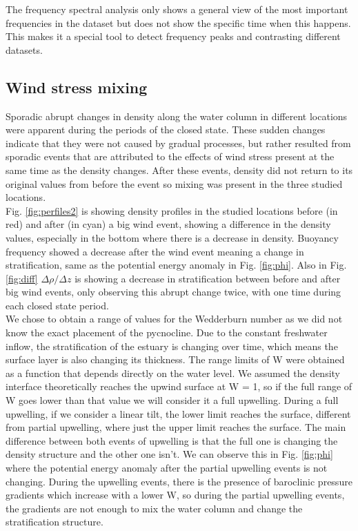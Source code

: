 \documentclass[tesis.tex]{subfiles}
\begin{document}
The frequency spectral analysis only shows a general view of the most important frequencies in the dataset but does not show the specific time when this happens. This makes it a special tool to detect frequency peaks and contrasting different datasets.\\

\subsection{Wind stress mixing}

Sporadic abrupt changes in density along the water column in different locations were apparent during the periods of the closed state. These sudden changes indicate that they were not caused by gradual processes, but rather resulted from sporadic events that are attributed to the effects of wind stress present at the same time as the density changes. After these events, density did not return to its original values from before the event so mixing was present in the three studied locations.\\

Fig. \ref{fig:perfiles2} is showing density profiles in the studied locations before (in red) and after (in cyan) a big wind event, showing a difference in the density values, especially in the bottom where there is a decrease in density. Buoyancy frequency showed a decrease after the wind event meaning a change in stratification, same as the potential energy anomaly in Fig. \ref{fig:phi}. Also in Fig. \ref{fig:diff} $\Delta \rho/\Delta z$ is showing a decrease in stratification between before and after big wind events, only observing this abrupt change twice, with one time during each closed state period.\\

We chose to obtain a range of values for the Wedderburn number as we did not know the exact placement of the pycnocline. Due to the constant freshwater inflow, the stratification of the estuary is changing over time, which means the surface layer is also changing its thickness. The range limits of W were obtained as a function that depends directly on the water level. We assumed the density interface theoretically reaches the upwind surface at W = 1, so if the full range of W goes lower than that value we will consider it a full upwelling. During a full upwelling, if we consider a linear tilt, the lower limit reaches the surface, different from partial upwelling, where just the upper limit reaches the surface. The main difference between both events of upwelling is that the full one is changing the density structure and the other one isn't. We can observe this in Fig. \ref{fig:phi} where the potential energy anomaly after the partial upwelling events is not changing. During the upwelling events, there is the presence of baroclinic pressure gradients which increase with a lower W, so during the partial upwelling events, the gradients are not enough to mix the water column and change the stratification structure.\\
\end{document}
